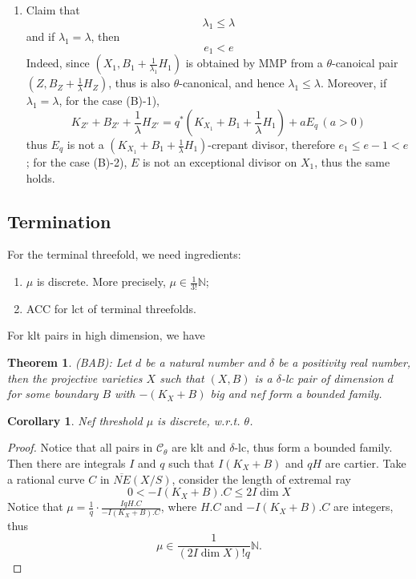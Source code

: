 \documentclass{article}
\newtheorem{thm}[defn]{Theorem}
\newtheorem{cor}[defn]{Corollary}
\begin{document}
\begin{enumerate}[(A)]
\begin{enumerate}[1)]
		\item Claim that 
		$$ \lambda_1\leqslant \lambda $$
		and if $ \lambda_1=\lambda $, then 
		$$ e_1<e $$
		Indeed, since $ (X_1,B_1+\frac{1}{\lambda_1}H_1) $ is obtained by MMP from a $ \theta $-canoical pair $ (Z,B_Z+\frac{1}{\lambda}H_Z) $, thus is also $ \theta $-canonical, and hence $ \lambda_1\leqslant \lambda $. Moreover, if $ \lambda_1=\lambda $, for the case (B)-1), 
		$$ K_{Z'}+B_{Z'}+\frac{1}{\lambda}H_{Z'}=q^*(K_{X_1}+B_1+\frac{1}{\lambda}H_1)+aE_q\, (a>0) $$
		thus $ E_q $ is not a $ (K_{X_1}+B_1+\frac{1}{\lambda}H_1) $-crepant divisor, therefore $ e_1\leqslant e-1<e $; for the case (B)-2), $ E $ is not an exceptional divisor on $ X_1 $, thus the same holds.
	\end{enumerate} 
\end{enumerate}

\subsection{Termination}
For the terminal threefold, we need ingredients:
\begin{enumerate}
	\item $ \mu $ is discrete. More precisely, $ \mu\in \frac{1}{3!}\mathbb{N} $;
	\item ACC for lct of terminal threefolds.
\end{enumerate}
For klt pairs in high dimension, we have
\begin{thm}
	(BAB): Let $ d $ be a natural number and $ \delta $ be a positivity real number, then the projective varieties $ X $ such that $ (X,B) $ is a $ \delta $-lc pair of dimension $ d $ for some boundary $ B $ with $ -(K_X+B) $ big  and nef form a bounded family.
\end{thm}

\begin{cor}
	Nef threshold $ \mu $ is discrete, w.r.t. $ \theta $.
\end{cor}
\begin{proof}
	Notice that all pairs in $ \mathcal{C}_\theta $ are klt and $ \delta $-lc, thus form a bounded family. Then there are integrals $ I $ and $ q $ such that $ I(K_X+B) $ and $ qH $ are cartier. Take a rational curve $ C $ in $ \overline{NE}(X/S) $, consider the length of extremal ray
	$$ 0<-I(K_X+B).C\leqslant 2I\dim X $$
	Notice that $ \mu=\frac{1}{q}\cdot\frac{IqH.C}{-I(K_X+B).C} $, where $ H.C $ and $ -I(K_X+B).C $ are integers, thus 
	$$ \mu\in \frac{1}{(2I\dim X)!q}\mathbb{N}.  $$
\end{proof}
\end{document}
